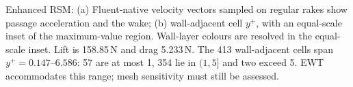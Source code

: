 \caption{Enhanced RSM: (a) Fluent-native velocity vectors sampled on regular rakes show passage acceleration and the wake; (b) wall-adjacent cell $y^+$, with an equal-scale inset of the maximum-value region. Wall-layer colours are resolved in the equal-scale inset. Lift is 158.85\,N and drag 5.233\,N. The 413 wall-adjacent cells span $y^+=0.147$--$6.586$: 57 are at most 1, 354 lie in $(1,5]$ and two exceed 5. EWT accommodates this range; mesh sensitivity must still be assessed.}
